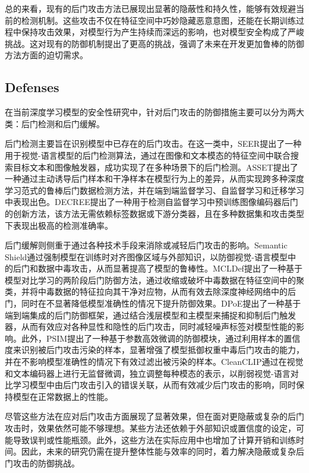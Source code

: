 \documentclass[lettersize,journal]{IEEEtran}
\begin{document}
总的来看，现有的后门攻击方法已展现出显著的隐蔽性和持久性，能够有效规避当前的检测机制。这些攻击不仅在特征空间中巧妙隐藏恶意意图，还能在长期训练过程中保持攻击效果，对模型行为产生持续而深远的影响，也对模型安全构成了严峻挑战。这对现有的防御机制提出了更高的挑战，强调了未来在开发更加鲁棒的防御方法方面的迫切需求。

\subsection{Defenses}
在当前深度学习模型的安全性研究中，针对后门攻击的防御措施主要可以分为两大类：后门检测和后门缓解。%

后门检测主要旨在识别模型中已存在的后门攻击。在这一类中，SEER\cite{zhu2024seer}提出了一种用于视觉-语言模型的后门检测算法，通过在图像和文本模态的特征空间中联合搜索目标文本和图像触发器，成功实现了在多种场景下的后门检测。ASSET\cite{pan2023asset}提出了一种通过主动诱导后门样本和干净样本在模型行为上的差异，从而实现跨多种深度学习范式的鲁棒后门数据检测方法，并在端到端监督学习、自监督学习和迁移学习中表现出色。DECREE\cite{feng2023detecting}提出了一种用于检测自监督学习中预训练图像编码器后门的创新方法，该方法无需依赖标签数据或下游分类器，且在多种数据集和攻击类型下表现出极高的检测准确率。

后门缓解则侧重于通过各种技术手段来消除或减轻后门攻击的影响。Semantic Shield\cite{ishmam2024semantic}通过强制模型在训练时对齐图像区域与外部知识，以防御视觉-语言模型中的后门和数据中毒攻击，从而显著提高了模型的鲁棒性。MCLDef\cite{yue2023model}提出了一种基于模型对比学习的两阶段后门防御方法，通过收缩或破坏中毒数据在特征空间中的聚类，并将中毒数据的特征拉向其干净对应物，从而有效去除深度神经网络中的后门，同时在不显著降低模型准确性的情况下提升防御效果。DPoE\cite{liu2023shortcuts}提出了一种基于端到端集成的后门防御框架，通过结合浅层模型和主模型来捕捉和抑制后门触发器，从而有效应对各种显性和隐性的后门攻击，同时减轻噪声标签对模型性能的影响。此外，PSIM\cite{zhao2024defending}提出了一种基于参数高效微调的防御模块，通过利用样本的置信度来识别被后门攻击污染的样本，显著增强了模型抵御权重中毒后门攻击的能力，并在不影响模型准确性的情况下有效过滤出被污染的样本。CleanCLIP\cite{bansal2023cleanclip}通过在视觉和文本编码器上进行无监督微调，独立调整每种模态的表示，以削弱视觉-语言对比学习模型中由后门攻击引入的错误关联，从而有效减少后门攻击的影响，同时保持模型在正常数据上的性能。

尽管这些方法在应对后门攻击方面展现了显著效果，但在面对更隐蔽或复杂的后门攻击时，效果依然可能不够理想。某些方法还依赖于外部知识或置信度的设定，可能导致误判或性能瓶颈。此外，这些方法在实际应用中也增加了计算开销和训练时间。因此，未来的研究仍需在提升整体性能与效率的同时，着力解决隐蔽或复杂后门攻击的防御挑战。
\end{document}
